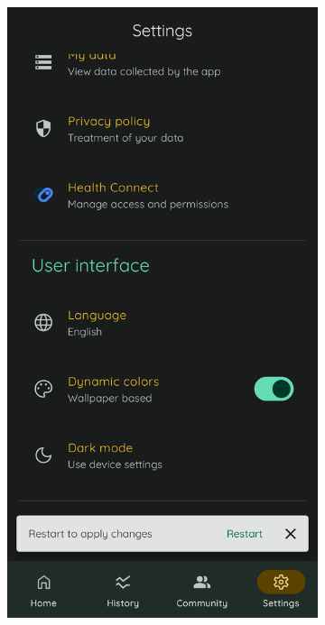             \begin{figure}[htbp]
                \centering
                \begin{subfigure}[c]{0.4\textwidth}
                    \centering
                    \includegraphics[width=1\textwidth]{figures/pruebas/colores_dinamicos/Antes.png}

\end{subfigure}
\end{figure}
